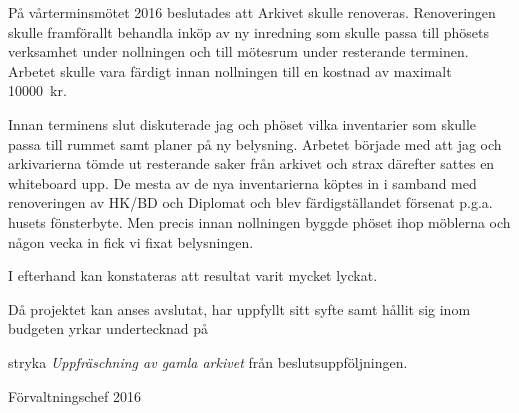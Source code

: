 \documentclass[../_main/handlingar.tex]{subfiles}
\begin{document}

På vårterminsmötet 2016 beslutades att Arkivet skulle renoveras. Renoveringen skulle framförallt behandla inköp av ny inredning som skulle passa till phösets verksamhet under nollningen och till mötesrum under resterande terminen. Arbetet skulle vara färdigt innan nollningen till en kostnad av maximalt \SI{10000}{kr}.

Innan terminens slut diskuterade jag och phöset vilka inventarier som skulle passa till rummet samt planer på ny belysning. Arbetet började med att jag och arkivarierna tömde ut resterande saker från arkivet och strax därefter sattes en whiteboard upp. De mesta av de nya inventarierna köptes in i samband med renoveringen av HK/BD och Diplomat och blev färdigställandet försenat p.g.a. husets fönsterbyte. Men precis innan nollningen byggde phöset ihop möblerna och någon vecka in fick vi fixat belysningen.

I efterhand kan konstateras att resultat varit mycket lyckat.

Då projektet kan anses avslutat, har uppfyllt sitt syfte samt hållit sig inom budgeten yrkar undertecknad på

\begin{attsatser}
    \att stryka \emph{Uppfräschning av gamla arkivet} från beslutsuppföljningen.
\end{attsatser}

\begin{signatures}{1}
    \mvh
    \signature{Anders Nilsson}{Förvaltningschef 2016}
\end{signatures}
\end{document}
